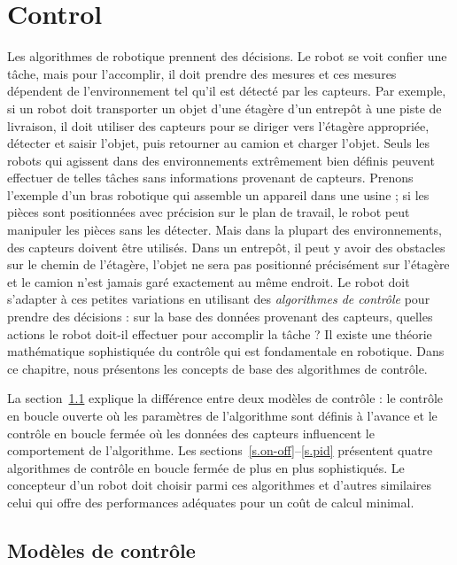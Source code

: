 
\chapter{Control}\label{ch.control}

Les algorithmes de robotique prennent des décisions. Le robot se voit confier une tâche, mais pour l'accomplir, il doit prendre des mesures et ces mesures dépendent de l'environnement tel qu'il est détecté par les capteurs. Par exemple, si un robot doit transporter un objet d'une étagère d'un entrepôt à une piste de livraison, il doit utiliser des capteurs pour se diriger vers l'étagère appropriée, détecter et saisir l'objet, puis retourner au camion et charger l'objet. Seuls les robots qui agissent dans des environnements extrêmement bien définis peuvent effectuer de telles tâches sans informations provenant de capteurs. Prenons l'exemple d'un bras robotique qui assemble un appareil dans une usine ; si les pièces sont positionnées avec précision sur le plan de travail, le robot peut manipuler les pièces sans les détecter. Mais dans la plupart des environnements, des capteurs doivent être utilisés. Dans un entrepôt, il peut y avoir des obstacles sur le chemin de l'étagère, l'objet ne sera pas positionné précisément sur l'étagère et le camion n'est jamais garé exactement au même endroit. Le robot doit s'adapter à ces petites variations en utilisant des \emph{algorithmes de contrôle} pour prendre des décisions : sur la base des données provenant des capteurs, quelles actions le robot doit-il effectuer pour accomplir la tâche ? Il existe une théorie mathématique sophistiquée du contrôle qui est fondamentale en robotique. Dans ce chapitre, nous présentons les concepts de base des algorithmes de contrôle.

La section~\ref{s.control-model} explique la différence entre deux modèles de contrôle : le contrôle en boucle ouverte où les paramètres de l'algorithme sont définis à l'avance et le contrôle en boucle fermée où les données des capteurs influencent le comportement de l'algorithme. Les sections~\ref{s.on-off}--\ref{s.pid} présentent quatre algorithmes de contrôle en boucle fermée de plus en plus sophistiqués. Le concepteur d'un robot doit choisir parmi ces algorithmes et d'autres similaires celui qui offre des performances adéquates pour un coût de calcul minimal.

\section{Modèles de contrôle}\label{s.control-model}

